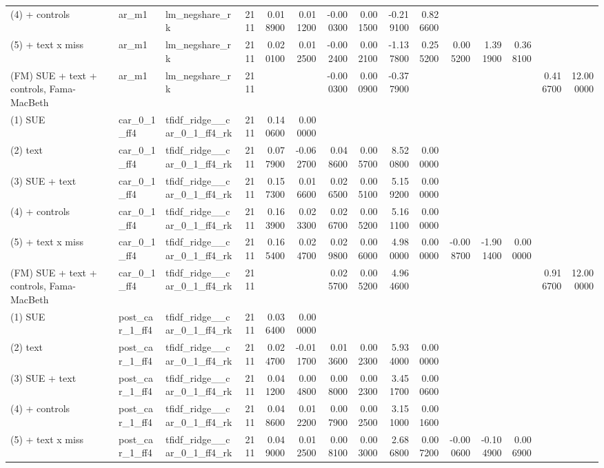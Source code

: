 \begin{table}
\begin{tabular}{lllrrrrrrrrrrrr}
(4) + controls & ar\_m1 & lm\_negshare\_rk & 2111 & 0.018900 & 0.011200 & -0.000300 & 0.001500 & -0.219100 & 0.826600 &  &  &  &  &  \\
(5) + text x miss & ar\_m1 & lm\_negshare\_rk & 2111 & 0.020100 & 0.012500 & -0.002400 & 0.002100 & -1.137800 & 0.255200 & 0.005200 & 1.391900 & 0.368100 &  &  \\
(FM) SUE + text + controls, Fama-MacBeth & ar\_m1 & lm\_negshare\_rk & 2111 &  &  & -0.000300 & 0.000900 & -0.377900 &  &  &  &  & 0.416700 & 12.000000 \\
(1) SUE & car\_0\_1\_ff4 & tfidf\_ridge\_\_car\_0\_1\_ff4\_rk & 2111 & 0.140600 & 0.000000 &  &  &  &  &  &  &  &  &  \\
(2) text & car\_0\_1\_ff4 & tfidf\_ridge\_\_car\_0\_1\_ff4\_rk & 2111 & 0.077900 & -0.062700 & 0.048600 & 0.005700 & 8.520800 & 0.000000 &  &  &  &  &  \\
(3) SUE + text & car\_0\_1\_ff4 & tfidf\_ridge\_\_car\_0\_1\_ff4\_rk & 2111 & 0.157300 & 0.016600 & 0.026500 & 0.005100 & 5.159200 & 0.000000 &  &  &  &  &  \\
(4) + controls & car\_0\_1\_ff4 & tfidf\_ridge\_\_car\_0\_1\_ff4\_rk & 2111 & 0.163900 & 0.023300 & 0.026700 & 0.005200 & 5.161100 & 0.000000 &  &  &  &  &  \\
(5) + text x miss & car\_0\_1\_ff4 & tfidf\_ridge\_\_car\_0\_1\_ff4\_rk & 2111 & 0.165400 & 0.024700 & 0.029800 & 0.006000 & 4.980000 & 0.000000 & -0.008700 & -1.901400 & 0.000000 &  &  \\
(FM) SUE + text + controls, Fama-MacBeth & car\_0\_1\_ff4 & tfidf\_ridge\_\_car\_0\_1\_ff4\_rk & 2111 &  &  & 0.025700 & 0.005200 & 4.964600 &  &  &  &  & 0.916700 & 12.000000 \\
(1) SUE & post\_car\_1\_ff4 & tfidf\_ridge\_\_car\_0\_1\_ff4\_rk & 2111 & 0.036400 & 0.000000 &  &  &  &  &  &  &  &  &  \\
(2) text & post\_car\_1\_ff4 & tfidf\_ridge\_\_car\_0\_1\_ff4\_rk & 2111 & 0.024700 & -0.011700 & 0.013600 & 0.002300 & 5.934000 & 0.000000 &  &  &  &  &  \\
(3) SUE + text & post\_car\_1\_ff4 & tfidf\_ridge\_\_car\_0\_1\_ff4\_rk & 2111 & 0.041200 & 0.004800 & 0.008000 & 0.002300 & 3.451700 & 0.000600 &  &  &  &  &  \\
(4) + controls & post\_car\_1\_ff4 & tfidf\_ridge\_\_car\_0\_1\_ff4\_rk & 2111 & 0.048600 & 0.012200 & 0.007900 & 0.002500 & 3.151000 & 0.001600 &  &  &  &  &  \\
(5) + text x miss & post\_car\_1\_ff4 & tfidf\_ridge\_\_car\_0\_1\_ff4\_rk & 2111 & 0.049000 & 0.012500 & 0.008100 & 0.003000 & 2.686800 & 0.007200 & -0.000600 & -0.104900 & 0.006900 &  &  \\

\end{tabular}
\end{table}
